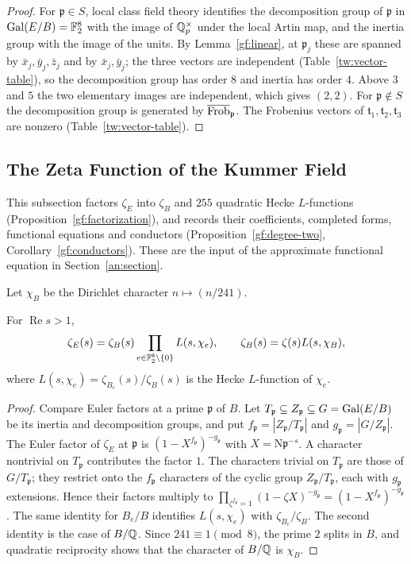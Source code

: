 \begin{proof}
For $\mathfrak p\in S$, local class field theory identifies the
decomposition group of $\mathfrak p$ in $\operatorname{Gal}(E/B)=\mathbb F_2^8$ with the image
of $\mathbb Q_p^\times$ under the local Artin map, and the inertia group with the
image of the units. By Lemma~\ref{gf:linear}, at $\mathfrak p_j$ these are
spanned by $\bar x_j,\bar y_j,\bar z_j$ and by $\bar x_j,\bar y_j$; the three
vectors are independent (Table~\ref{tw:vector-table}), so the decomposition
group has order $8$ and inertia has order $4$. Above $3$ and $5$ the two
elementary images are independent, which gives $(2,2)$. For
$\mathfrak p\notin S$ the decomposition group is generated by
$\overline{\operatorname{Frob}}_{\mathfrak p}$. The Frobenius vectors of $\mathfrak t_1,\mathfrak
t_2,\mathfrak t_3$ are nonzero (Table~\ref{tw:vector-table}).
\end{proof}

\subsection{The Zeta Function of the Kummer Field}\label{gf:zeta-section}
This subsection factors $\zeta_E$ into $\zeta_B$ and $255$ quadratic Hecke
$L$-functions (Proposition~\ref{gf:factorization}), and records their
coefficients, completed forms, functional equations and conductors
(Proposition~\ref{gf:degree-two}, Corollary~\ref{gf:conductors}). These are
the input of the approximate functional equation in
Section~\ref{an:section}.

Let $\chi_B$ be the Dirichlet character $n\mapsto(n/241)$.

\begin{proposition}\label{gf:factorization}
For $\operatorname{Re}s>1$,
\[
 \zeta_E(s)=\zeta_B(s)\prod_{e\in\mathbb F_2^8\setminus\{0\}}L(s,\chi_e),
 \qquad \zeta_B(s)=\zeta(s)L(s,\chi_B),
\]
where $L(s,\chi_e)=\zeta_{B_e}(s)/\zeta_B(s)$ is the Hecke $L$-function of
$\chi_e$.
\end{proposition}

\begin{proof}
Compare Euler factors at a prime $\mathfrak p$ of $B$. Let $T_{\mathfrak
p}\subseteq Z_{\mathfrak p}\subseteq G=\operatorname{Gal}(E/B)$ be its inertia and
decomposition groups, and put $f_{\mathfrak p}=|Z_{\mathfrak p}/T_{\mathfrak
p}|$ and $g_{\mathfrak p}=|G/Z_{\mathfrak p}|$. The Euler factor of $\zeta_E$
at $\mathfrak p$ is $(1-X^{f_{\mathfrak p}})^{-g_{\mathfrak p}}$ with
$X=\mathrm N\mathfrak p^{-s}$. A character nontrivial on $T_{\mathfrak p}$
contributes the factor $1$. The characters trivial on $T_{\mathfrak p}$ are
those of $G/T_{\mathfrak p}$; they restrict onto the $f_{\mathfrak p}$
characters of the cyclic group $Z_{\mathfrak p}/T_{\mathfrak p}$, each with
$g_{\mathfrak p}$ extensions. Hence their factors multiply to
$\prod_{\zeta^{f_{\mathfrak p}}=1}(1-\zeta X)^{-g_{\mathfrak p}}
=(1-X^{f_{\mathfrak p}})^{-g_{\mathfrak p}}$. The same identity for $B_e/B$
identifies $L(s,\chi_e)$ with $\zeta_{B_e}/\zeta_B$. The second identity is
the case of $B/\mathbb Q$. Since $241\equiv1\pmod8$, the prime $2$ splits in $B$,
and quadratic reciprocity shows that the character of $B/\mathbb Q$ is
$\chi_B$.
\end{proof}

